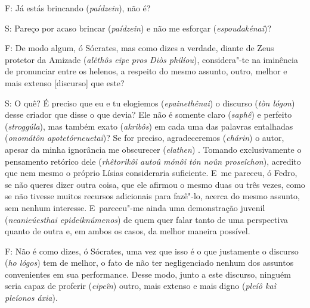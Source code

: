 F: Já estás brincando (\emph{paídzein}), não é?

S: Pareço por acaso brincar (\emph{paídzein}) e não me esforçar
(\emph{espoudakénai})?

\bekker{[234e]} F: De modo algum, ó Sócrates, mas como dizes a verdade,
diante de Zeus protetor da Amizade (\emph{alêthôs eipe pros Diòs
philíou}), considera"-te na iminência de pronunciar entre os helenos, a
respeito do mesmo assunto, outro, melhor e mais extenso [discurso]
que este?

S: O quê? É preciso que eu e tu elogiemos (\emph{epainethênai}) o
discurso (\emph{tòn lógon}) desse criador que disse o que devia? Ele não
é somente claro (\emph{saphê}) e perfeito (\emph{stroggúla}), mas também
exato (\emph{akribôs}) em cada uma das palavras entalhadas
(\emph{onomátôn apotetórneuetai})? Se for preciso, agradeceremos
(\emph{chárin}) o autor, apesar da minha ignorância me obscurecer
(\emph{elathen}) \bekker{[235a]}. Tomando exclusivamente o pensamento
retórico dele (\emph{rhêtorikôi autoû mónôi tón noûn proseîchon}),
acredito que nem mesmo o próprio Lísias consideraria suficiente. E~me
pareceu, ó Fedro, se não queres dizer outra coisa, que ele afirmou o
mesmo duas ou três vezes, como se não tivesse muitos recursos adicionais
para fazê"-lo, acerca do mesmo assunto, sem nenhum interesse. E~pareceu"-me ainda uma demonstração juvenil (\emph{neanieúesthai
epideiknúmenos}) de quem quer falar tanto de uma perspectiva quanto de
outra e, em ambos os casos, da melhor maneira possível.

\bekker{[235b]} F: Não é como dizes, ó Sócrates, uma vez que isso é o que
justamente o discurso (\emph{ho lógos}) tem de melhor, o fato de não ter
negligenciado nenhum dos assuntos convenientes em sua performance. Desse
modo, junto a este discurso, ninguém seria capaz de proferir
(\emph{eipeîn}) outro, mais extenso e mais digno (\emph{pleíô kaì
pleíonos áxia}).

